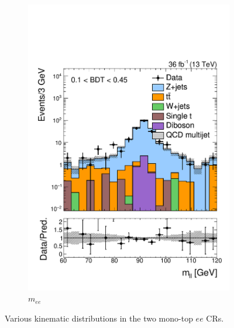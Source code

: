 \begin{figure}[]
\begin{center}
\begin{subfigure}[t]{0.32\textwidth}
            \includegraphics[width=\textwidth]{figures/monotop/prefit/dielectron_loose_diLepMass_logy.pdf}
            \caption{$m_{ee}$}
        \end{subfigure}
        \caption{Various kinematic distributions in the two mono-top $ee$ CRs. }
        \label{fig:mt:prefit_dielectron}
    \end{center}
\end{figure}

